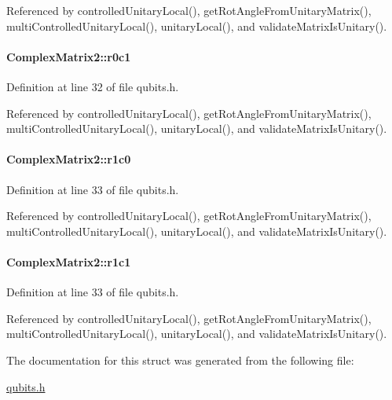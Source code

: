 Referenced by controlledUnitaryLocal(), getRotAngleFromUnitaryMatrix(), multiControlledUnitaryLocal(), unitaryLocal(), and validateMatrixIsUnitary().\hypertarget{structComplexMatrix2_a0f3932f055a8b05cef361bce25d51172}{
\paragraph[{r0c1}]{ {\bf ComplexMatrix2::r0c1}}\hfill}
\label{structComplexMatrix2_a0f3932f055a8b05cef361bce25d51172}


Definition at line 32 of file qubits.h.

Referenced by controlledUnitaryLocal(), getRotAngleFromUnitaryMatrix(), multiControlledUnitaryLocal(), unitaryLocal(), and validateMatrixIsUnitary().\hypertarget{structComplexMatrix2_ab98282015ed2065e53fbc9638e2583ab}{
\paragraph[{r1c0}]{ {\bf ComplexMatrix2::r1c0}}\hfill}
\label{structComplexMatrix2_ab98282015ed2065e53fbc9638e2583ab}


Definition at line 33 of file qubits.h.

Referenced by controlledUnitaryLocal(), getRotAngleFromUnitaryMatrix(), multiControlledUnitaryLocal(), unitaryLocal(), and validateMatrixIsUnitary().\hypertarget{structComplexMatrix2_a763007c3070802373549ba0350f83c8a}{
\paragraph[{r1c1}]{ {\bf ComplexMatrix2::r1c1}}\hfill}
\label{structComplexMatrix2_a763007c3070802373549ba0350f83c8a}


Definition at line 33 of file qubits.h.

Referenced by controlledUnitaryLocal(), getRotAngleFromUnitaryMatrix(), multiControlledUnitaryLocal(), unitaryLocal(), and validateMatrixIsUnitary().

The documentation for this struct was generated from the following file:\begin{DoxyCompactItemize}
\item 
\hyperlink{qubits_8h}{qubits.h}\end{DoxyCompactItemize}
